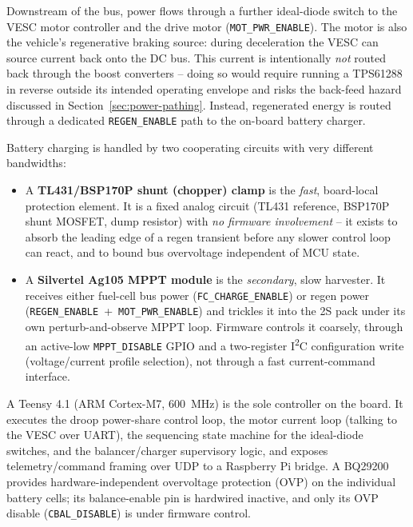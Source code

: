 Downstream of the bus, power flows through a further ideal-diode switch to
the VESC motor controller and the drive motor (\texttt{MOT\_PWR\_ENABLE}).
The motor is also the vehicle's regenerative braking source: during
deceleration the VESC can source current back onto the DC bus. This
current is intentionally \emph{not} routed back through the boost
converters -- doing so would require running a TPS61288 in reverse outside
its intended operating envelope and risks the back-feed hazard discussed
in Section~\ref{sec:power-pathing}. Instead, regenerated energy is routed
through a dedicated \texttt{REGEN\_ENABLE} path to the on-board battery
charger.

Battery charging is handled by two cooperating circuits with very
different bandwidths:

\begin{itemize}
  \item A \textbf{TL431/BSP170P shunt (chopper) clamp} is the
    \emph{fast}, board-local protection element. It is a fixed analog
    circuit (TL431 reference, BSP170P shunt MOSFET, dump resistor) with
    \emph{no firmware involvement} -- it exists to absorb the leading edge
    of a regen transient before any slower control loop can react, and to
    bound bus overvoltage independent of MCU state.
  \item A \textbf{Silvertel Ag105 MPPT module} is the \emph{secondary},
    slow harvester. It receives either fuel-cell bus power
    (\texttt{FC\_CHARGE\_ENABLE}) or regen power
    (\texttt{REGEN\_ENABLE}~+~\texttt{MOT\_PWR\_ENABLE}) and trickles it
    into the 2S pack under its own perturb-and-observe MPPT loop. Firmware
    controls it coarsely, through an active-low \texttt{MPPT\_DISABLE}
    GPIO and a two-register I\textsuperscript{2}C configuration write
    (voltage/current profile selection), not through a fast current-command
    interface.
\end{itemize}


A Teensy 4.1 (ARM Cortex-M7, \SI{600}{\mega\hertz}) is the sole controller
on the board. It executes the droop power-share control loop, the motor
current loop (talking to the VESC over UART), the sequencing state
machine for the ideal-diode switches, and the balancer/charger
supervisory logic, and exposes telemetry/command framing over UDP to a
Raspberry Pi bridge. A BQ29200 provides hardware-independent
overvoltage protection (OVP) on the individual battery cells; its
balance-enable pin is hardwired inactive, and only its OVP disable
(\texttt{CBAL\_DISABLE}) is under firmware control.

